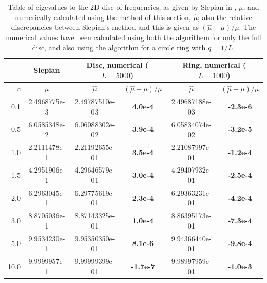 \documentclass[11pt,a4paper, 
swedish,english %
]{article}
\begin{document}
\begin{table}

\centering
\caption{Table of eigevalues to the 2D disc of frequencies, as given
  by Slepian in \cite{PSWF-IV_1964}, $\mu$, and numerically
  calculated using the method of this section, $\hat\mu$; also the
  relative discrepancies between Slepian's method and this is given as
  $(\hat\mu-\mu)/\mu$. The numerical values have been
  calculated using both the algorithem for only the full disc, and
  also using the algorithm for a circle ring with $q=1/L$.
}
\label{tab:just}
\begin{tabular}{|r|c|c|c|c|c|}\cline{2-6}
\multicolumn{1}{c|}{}
&Slepian\cite{PSWF-IV_1964}&
\multicolumn{2}{|c|}{Disc, numerical ($L=5000$)}&
\multicolumn{2}{|c|}{Ring, numerical ($L=1000$)}
\\ \hline
$c$\phantom{1.}&$\mu$
&$\hat\mu$&$(\hat\mu-\mu)/\mu$
&$\hat\mu$&$(\hat\mu-\mu)/\mu$
\\ \hline
  0.1 & 2.4968775e-3 & 
2.49787510e-03 &\bf\phantom{-}4.0e-4&  
2.49687188e-03 &\bf-2.3e-6
\\ \hline
  0.5 & 6.0585348e-2 & 
6.06088302e-02 &\bf\phantom{-}3.9e-4&  
6.05834074e-02 &\bf-3.2e-5
\\ \hline
  1.0 & 2.2111478e-1 & 
2.21192655e-01 &\bf\phantom{-}3.5e-4&  
2.21087997e-01 &\bf-1.2e-4
\\ \hline
  1.5 & 4.2951906e-1 & 
4.29646579e-01 &\bf\phantom{-}3.0e-4&  
4.29407932e-01 &\bf-2.5e-4
\\ \hline
  2.0 & 6.2963045e-1 & 
6.29775619e-01 &\bf\phantom{-}2.3e-4&  
6.29363231e-01 &\bf-4.2e-4
\\ \hline
  3.0 & 8.8705036e-1 & 
8.87143325e-01 &\bf\phantom{-}1.0e-4&  
8.86395173e-01 &\bf-7.3e-4
\\ \hline
  5.0 & 9.9534230e-1 & 
9.95350350e-01 &\bf\phantom{-}8.1e-6&  
9.94366440e-01 &\bf-9.8e-4
\\ \hline
 10.0 & 9.9999957e-1 & 
9.99999399e-01 &\bf\phantom{}-1.7e-7&  
9.98997959e-01 &\bf-1.0e-3
\\ \hline
\end{tabular}
\end{table}


\end{document}
